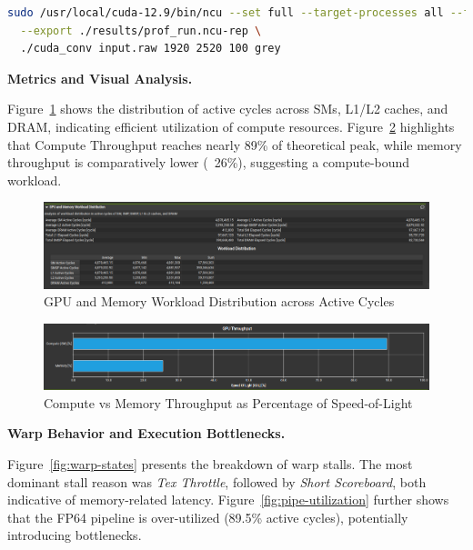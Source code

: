 \documentclass[conference, 10pt]{IEEEtran}
\begin{document}
\begin{lstlisting}[language=bash, caption={Nsight Compute Profiling Command}]
sudo /usr/local/cuda-12.9/bin/ncu --set full --target-processes all --force-overwrite \
  --export ./results/prof_run.ncu-rep \
  ./cuda_conv input.raw 1920 2520 100 grey
\end{lstlisting}

\textbf{Metrics and Visual Analysis.}

Figure~\ref{fig:workload-distribution} shows the distribution of active cycles across SMs, L1/L2 caches, and DRAM, indicating efficient utilization of compute resources.  
Figure~\ref{fig:gpu-throughput} highlights that Compute Throughput reaches nearly 89\% of theoretical peak, while memory throughput is comparatively lower (~26\%), suggesting a compute-bound workload.

\vspace{1em}

\begin{figure}[H]
    \centering
    \includegraphics[width=0.95\linewidth]{figures/WorkloadDistribution.png}
    \caption{GPU and Memory Workload Distribution across Active Cycles}
    \label{fig:workload-distribution}
\end{figure}

\begin{figure}[H]
    \centering
    \includegraphics[width=0.9\linewidth]{figures/GPU_Throughput.png}
    \caption{Compute vs Memory Throughput as Percentage of Speed-of-Light}
    \label{fig:gpu-throughput}
\end{figure}

\textbf{Warp Behavior and Execution Bottlenecks.}

Figure~\ref{fig:warp-states} presents the breakdown of warp stalls. The most dominant stall reason was \textit{Tex Throttle}, followed by \textit{Short Scoreboard}, both indicative of memory-related latency.  
Figure~\ref{fig:pipe-utilization} further shows that the FP64 pipeline is over-utilized (89.5\% active cycles), potentially introducing bottlenecks.
\end{document}
